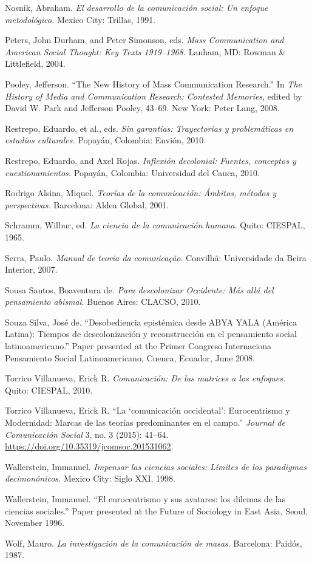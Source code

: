 \documentclass{tufte-handout}
\begin{document}
\begin{hangparas}{.25in}{1}
Nosnik, Abraham. \emph{El desarrollo de la comunicación social: Un
enfoque metodológico.} Mexico City: Trillas, 1991.

Peters, John Durham, and Peter Simonson, eds. \emph{Mass Communication
and American Social Thought: Key Texts 1919--1968.} Lanham, MD: Rowman
\& Littlefield, 2004.

Pooley, Jefferson. ``The New History of Mass Communication Research.''
In \emph{The History of Media and Communication Research: Contested
Memories}, edited by David W. Park and Jefferson Pooley, 43--69. New
York: Peter Lang, 2008.

Restrepo, Eduardo, et al., eds. \emph{Sin garantías: Trayectorias y
problemáticas en estudios culturales.} Popayán, Colombia: Envión, 2010.

Restrepo, Eduardo, and Axel Rojas. \emph{Inflexión decolonial: Fuentes,
conceptos y cuestionamientos.} Popayán, Colombia: Universidad del Cauca,
2010.

Rodrigo Alsina, Miquel. \emph{Teorías de la comunicación: Ámbitos,
métodos y perspectivas.} Barcelona: Aldea Global, 2001.

Schramm, Wilbur, ed. \emph{La ciencia de la comunicación humana}. Quito:
CIESPAL, 1965.

Serra, Paulo. \emph{Manual de teoria da comunicação}. Convilhã:
Universidade da Beira Interior, 2007.

Sousa Santos, Boaventura de. \emph{Para descolonizar Occidente: Más allá
del pensamiento abismal.} Buenos Aires: CLACSO, 2010.

Souza Silva, José de. ``Desobediencia epistémica desde ABYA YALA
(América Latina): Tiempos de descolonización y reconstrucción en el
pensamiento social latinoamericano.'' Paper presented at the Primer
Congreso Internaciona Pensamiento Social Latinoamericano, Cuenca,
Ecuador, June 2008.

Torrico Villanueva, Erick R. \emph{Comunicación: De las matrices a los
enfoques.} Quito: CIESPAL, 2010.

Torrico Villanueva, Erick R. ``La `comunicación occidental':
Eurocentrismo y Modernidad: Marcas de las teorías predominantes en el
campo.'' \emph{Journal de Comunicación Social} 3, no. 3 (2015): 41--64.
\url{https://doi.org/10.35319/jcomsoc.201531062}.

Wallerstein, Immanuel. \emph{Impensar las ciencias sociales: Límites de
los paradigmas decimonónicos.} Mexico City: Siglo XXI, 1998.

Wallerstein, Immanuel. ``El eurocentrismo y sus avatares: los dilemas de
las ciencias sociales.'' Paper presented at the Future of Sociology in
East Asia, Seoul, November 1996.

Wolf, Mauro. \emph{La investigación de la comunicación de masas}.
Barcelona: Paidós, 1987.



\end{hangparas}
\end{document}
